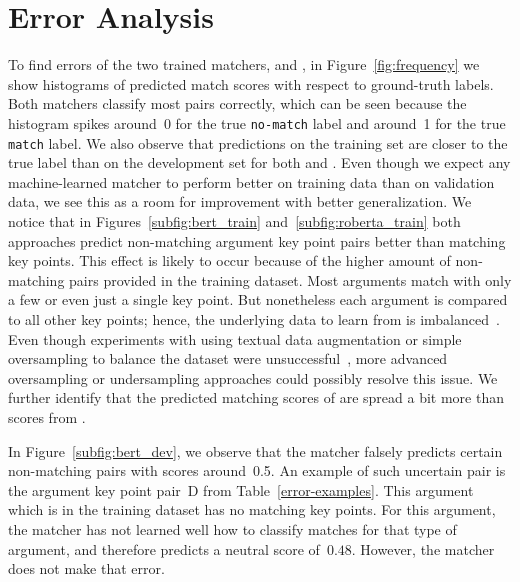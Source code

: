 \section{Error Analysis}\label{error-analysis}


%

To find errors of the two trained matchers, \BertBase and \RobertaBase, in Figure~\ref{fig:frequency} we show 
histograms of predicted match scores with respect to ground-truth labels.
Both matchers classify most pairs correctly, which can be seen because the histogram spikes around~0 for the 
true \texttt{no-match} label and around~1 for the true \texttt{match} label.
We also observe that predictions on the training set are closer to the true label than on the development set for both \RobertaBase and \BertBase. 
Even though we expect any machine-learned matcher to perform better on training data than on validation data, 
we see this as a room for improvement with better generalization.
We notice that in Figures~\ref{subfig:bert_train} and~\ref{subfig:roberta_train} both approaches predict non-matching 
argument key point pairs better than matching key points.
This effect is likely to occur because of the higher amount of non-matching pairs provided in the training dataset.
Most arguments match with only a few or even just a single key point.
But nonetheless each argument is compared to all other key points; hence, the underlying data to learn from is 
imbalanced~\cite{BarandelaVSF2004}.
Even though experiments with using textual data augmentation or simple oversampling to balance the dataset were 
unsuccessful~\cite{Dietterich1995}, more advanced oversampling or undersampling approaches could possibly resolve this issue.
We further identify that the predicted matching scores of \BertBase are spread a 
bit more than scores from \RobertaBase.

In Figure~\ref{subfig:bert_dev}, we observe that the \BertBase matcher falsely predicts certain non-matching pairs with scores around~0.5.
An example of such uncertain pair is the argument key point pair~D from Table~\ref{error-examples}.
This argument which is in the training dataset has no matching key points.
For this argument, the \mbox{\BertBase} matcher has not learned well how to classify matches for that type of argument, and therefore predicts a neutral score of~\(0.48\).
However, the \RobertaBase matcher does not make that error. 


